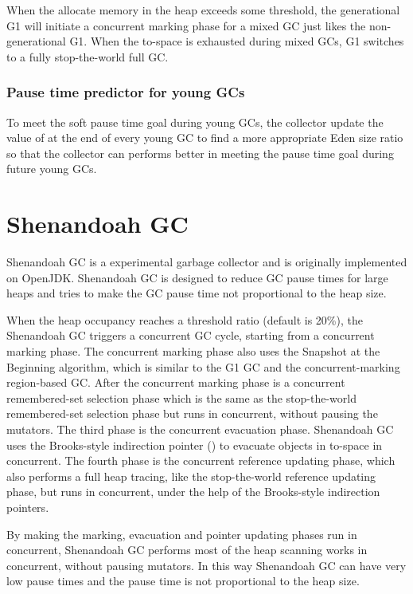 When the allocate memory in the heap exceeds some threshold, the generational G1 will
initiate a concurrent marking phase for a mixed GC just likes the non-generational G1.
When the to-space is exhausted during mixed GCs, G1 switches to a fully stop-the-world full GC.

\subsubsection{Pause time predictor for young GCs}

To meet the soft pause time goal during young GCs, the collector update the value of 
at the end of every young GC to find a more appropriate Eden size ratio so that
the collector can performs better in meeting the pause time goal during future young GCs.
 
\section{Shenandoah GC}

Shenandoah GC is a experimental garbage collector and is originally implemented on OpenJDK.
Shenandoah GC is designed to reduce GC pause times for large heaps and tries to make the GC pause
time not proportional to the heap size.
 
When the heap occupancy reaches a threshold ratio (default is 20\%), the Shenandoah GC triggers
a concurrent GC cycle, starting from a concurrent marking phase.
The concurrent marking phase also uses the Snapshot at the Beginning algorithm,
which is similar to the G1 GC and the concurrent-marking region-based GC.
After the concurrent marking phase is a concurrent remembered-set selection phase
which is the same as the stop-the-world remembered-set selection phase
but runs in concurrent, without pausing the mutators.
The third phase is the concurrent evacuation phase. Shenandoah GC uses the Brooks-style
indirection pointer (\cite{flood2016shenandoah}) to evacuate objects in to-space
in concurrent. The fourth phase is the concurrent reference updating phase, which
also performs a full heap tracing, like the stop-the-world reference updating phase,
but runs in concurrent, under the help of the Brooks-style indirection pointers.

By making the marking, evacuation and pointer updating phases run in concurrent, Shenandoah GC performs
most of the heap scanning works in concurrent, without pausing mutators. In this way
Shenandoah GC can have very low pause times and the pause time is not proportional
to the heap size.

